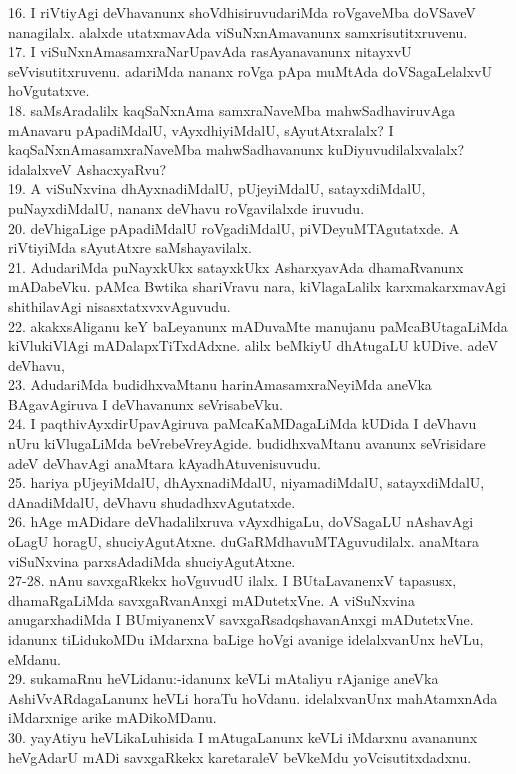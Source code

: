 \documentclass{article}
\begin{document}
16. I riVtiyAgi deVhavanunx shoVdhisiruvudariMda roVgaveMba doVSaveV nanagilalx. alalxde utatxmavAda viSuNxnAmavanunx samxrisutitxruvenu.\\
17. I viSuNxnAmasamxraNarUpavAda rasAyanavanunx nitayxvU seVvisutitxruvenu. adariMda nananx roVga pApa muMtAda doVSagaLelalxvU hoVgutatxve.\\
18. saMsAradalilx kaqSaNxnAma samxraNaveMba mahwSadhaviruvAga mAnavaru pApadiMdalU, vAyxdhiyiMdalU, sAyutAtxralalx? I kaqSaNxnAmasamxraNaveMba mahwSadhavanunx kuDiyuvudilalxvalalx? idalalxveV AshacxyaRvu?\\
19. A viSuNxvina dhAyxnadiMdalU, pUjeyiMdalU, satayxdiMdalU, puNayxdiMdalU, nananx deVhavu roVgavilalxde iruvudu.\\
20. deVhigaLige pApadiMdalU roVgadiMdalU, piVDeyuMTAgutatxde. A riVtiyiMda sAyutAtxre saMshayavilalx.\\
21. AdudariMda puNayxkUkx satayxkUkx AsharxyavAda dhamaRvanunx mADabeVku. pAMca Bwtika shariVravu nara, kiVlagaLalilx karxmakarxmavAgi shithilavAgi nisasxtatxvxvAguvudu.\\
22. akakxsAliganu keY baLeyanunx mADuvaMte manujanu paMcaBUtagaLiMda kiVlukiVlAgi mADalapxTiTxdAdxne. alilx beMkiyU dhAtugaLU kUDive. adeV deVhavu,\\
23. AdudariMda budidhxvaMtanu harinAmasamxraNeyiMda aneVka BAgavAgiruva I deVhavanunx seVrisabeVku.\\
24. I paqthivAyxdirUpavAgiruva paMcaKaMDagaLiMda kUDida I deVhavu nUru kiVlugaLiMda beVrebeVreyAgide. budidhxvaMtanu avanunx seVrisidare adeV deVhavAgi anaMtara kAyadhAtuvenisuvudu.\\
25. hariya pUjeyiMdalU, dhAyxnadiMdalU, niyamadiMdalU, satayxdiMdalU, dAnadiMdalU, deVhavu shudadhxvAgutatxde.\\
26. hAge mADidare deVhadalilxruva vAyxdhigaLu, doVSagaLU nAshavAgi oLagU horagU, shuciyAgutAtxne. duGaRMdhavuMTAguvudilalx. anaMtara viSuNxvina parxsAdadiMda shuciyAgutAtxne.\\
27-28. nAnu savxgaRkekx hoVguvudU ilalx. I BUtaLavanenxV tapasusx, dhamaRgaLiMda savxgaRvanAnxgi mADutetxVne. A viSuNxvina anugarxhadiMda I BUmiyanenxV savxgaRsadqshavanAnxgi mADutetxVne. idanunx tiLidukoMDu iMdarxna baLige hoVgi avanige idelalxvanUnx heVLu, eMdanu.\\
29. sukamaRnu heVLidanu:-idanunx keVLi mAtaliyu rAjanige aneVka AshiVvARdagaLanunx heVLi horaTu hoVdanu. idelalxvanUnx mahAtamxnAda iMdarxnige arike mADikoMDanu.\\
30. yayAtiyu heVLikaLuhisida I mAtugaLanunx keVLi iMdarxnu avananunx heVgAdarU mADi savxgaRkekx karetaraleV beVkeMdu yoVcisutitxdadxnu.\\
\end{document}
